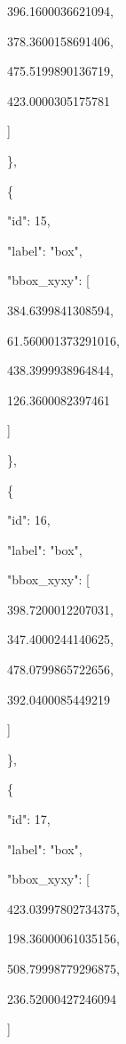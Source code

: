 \documentclass[10pt,a4paper]{article}
\begin{document}
        396.1600036621094,\allowbreak{}\par
        378.3600158691406,\allowbreak{}\par
        475.5199890136719,\allowbreak{}\par
        423.0000305175781\par
      ]\par
    \},\allowbreak{}\par
    \{\par
      "id":\allowbreak{} 15,\allowbreak{}\par
      "label":\allowbreak{} "box",\allowbreak{}\par
      "bbox\_xyxy":\allowbreak{} [\par
        384.6399841308594,\allowbreak{}\par
        61.560001373291016,\allowbreak{}\par
        438.3999938964844,\allowbreak{}\par
        126.3600082397461\par
      ]\par
    \},\allowbreak{}\par
    \{\par
      "id":\allowbreak{} 16,\allowbreak{}\par
      "label":\allowbreak{} "box",\allowbreak{}\par
      "bbox\_xyxy":\allowbreak{} [\par
        398.7200012207031,\allowbreak{}\par
        347.4000244140625,\allowbreak{}\par
        478.0799865722656,\allowbreak{}\par
        392.0400085449219\par
      ]\par
    \},\allowbreak{}\par
    \{\par
      "id":\allowbreak{} 17,\allowbreak{}\par
      "label":\allowbreak{} "box",\allowbreak{}\par
      "bbox\_xyxy":\allowbreak{} [\par
        423.03997802734375,\allowbreak{}\par
        198.36000061035156,\allowbreak{}\par
        508.79998779296875,\allowbreak{}\par
        236.52000427246094\par
      ]\par
\end{document}
